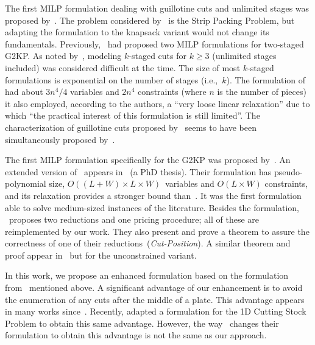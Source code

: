 \documentclass[ppgc,prop-tese,english,formais,babel]{iiufrgs}
\begin{document}
The first MILP formulation dealing with guillotine cuts and unlimited stages was proposed by~\citet{messaoud:2008}.
The problem considered by~\citet{messaoud:2008} is the Strip Packing Problem, but adapting the formulation to the knapsack variant would not change its fundamentals.
Previously, \citet{lodi:2003}~had proposed two MILP formulations for two-staged G2KP.
As noted by~\citet{belov_thesis:2003}, modeling \(k\)-staged cuts for \(k \geq 3\) (unlimited stages included) was considered difficult at the time.
The size of most \(k\)-staged formulations is exponential on the number of stages (i.e.,~\(k\)).
The formulation of~\citet{messaoud:2008} had about \(3n^4/4\) variables and \(2n^4\) constraints (where \(n\) is the number of pieces) it also employed, according to the authors, a ``very loose linear relaxation'' due to which ``the practical interest of this formulation is still limited''.
The characterization of guillotine cuts proposed by~\citet{messaoud:2008} seems to have been simultaneously proposed by~\citet{pisinger:2007}. %

The first MILP formulation specifically for the G2KP was proposed by~\citet{furini:2016}.
An extended version of~\citet{furini:2016} appears in~\citet{dimitri_thesis} (a PhD thesis).
Their formulation has pseudo-polynomial size, \(O((L + W) \times L \times W)\)~variables and \(O(L \times W)\) constraints, and its relaxation provides a stronger bound than~\citet{messaoud:2008}.
It was the first formulation able to solve medium-sized instances of the literature.
Besides the formulation, \citet{furini:2016}~proposes two reductions and one pricing procedure; all of these are reimplemented by our work.
They also present and prove a theorem to assure the correctness of one of their reductions~(\emph{Cut-Position}).
A similar theorem and proof appear in~\citet{song:2010} but for the unconstrained variant.

In this work, we propose an enhanced formulation based on the formulation from~\citet{furini:2016} mentioned above.
A significant advantage of our enhancement is to avoid the enumeration of any cuts after the middle of a plate.
This advantage appears in many works since~\citet{herz:1972}.
Recently, \citet{delorme:2019} adapted a formulation for the 1D Cutting Stock Problem to obtain this same advantage.
However, the way \citet{delorme:2019}~changes their formulation to obtain this advantage is not the same as our approach.
\end{document}
